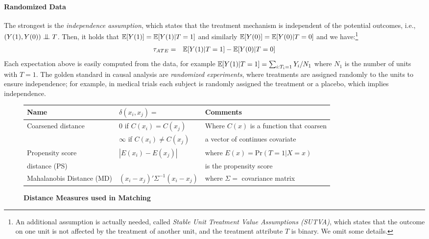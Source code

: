 \paragraph*{\bf{Randomized Data}}
The strongest is the {\em independence assumption}, which states that
the treatment mechanism is independent of the potential outcomes,
i.e., $(Y(1), Y(0)) \bigCI T$. Then, it holds that
$\mathbb{E}[Y(1)]=\mathbb{E}[Y(1)|T=1]$ and similarly $\mathbb{E}[Y(0)]=\mathbb{E}[Y(0)|T=0]$ and we
have:\footnote{An additional assumption is actually needed, called
  \emph{Stable Unit Treatment Value Assumptions (SUTVA)}, which states
  that the outcome on one unit is not affected by the treatment of
  another unit, and the treatment attribute $T$ is binary.  We omit
  some details.}
%
\vspace{-.1cm}
\begin{eqnarray}
  {\tau_{ATE}} &=& \mathbb{E}[Y(1)|T=1]-\mathbb{E}[Y(0)|T=0] \label{eq:indeass}
\end{eqnarray}
Each expectation above is easily computed from the data, for example
$\mathbb{E}[Y(1)|T=1] = \sum_{i: T_i=1} Y_i / N_1$ where $N_1$ is the number
of units with $T=1$.  The golden standard in causal analysis are {\em
  randomized experiments}, where treatments are assigned randomly to
the units to ensure independence; for example, in medical trials each
subject is randomly assigned the treatment or a placebo, which implies
independence.
\begin{figure*} \scriptsize
  \centering
  \begin{tabular}{|l|l|l|} \hline
    \bf{Name} &  $\delta(x_i,x_j)=$ & \bf{Comments} \\ \hline
Coarsened distance & 0 if $C(x_i)=C(x_j)$ & Where $C(x)$ is a function that coarsen \\
               & $\infty$ if $C(x_i) \neq C(x_j)$ & a vector of continues covariate~\cite{IacKinPor09}\\ \hline
Propensity score  & $|E(x_i) - E(x_j)|$ & where $E(x) = \textrm{Pr}(T = 1 | X=x)$\\
distance (PS)   &  & is the propensity score~\cite{Rubin1983b} \\ \hline
Mahalanobis Distance (MD) & $(x_i-x_j)'\Sigma^{-1} (x_i-x_j)$ & where $\Sigma=$ covariance matrix~\cite{Stuart10} \\ \hline
  \end{tabular}
  \caption{\bf{Distance Measures used in Matching}}
  \label{fig:metrics}
\end{figure*}

